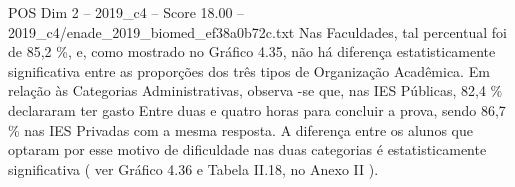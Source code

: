 \begin{textsample}{POS Dim 2 – 2019\_c4 – Score 18.00 – 2019\_c4/enade\_2019\_biomed\_ef38a0b72c.txt}
Nas Faculdades, tal percentual foi de 85,2 \%, e, como mostrado no Gráfico 4.35, não há diferença estatisticamente significativa entre as proporções dos três tipos de Organização Acadêmica.
Em relação às Categorias Administrativas, observa -se que, nas IES Públicas, 82,4 \% declararam ter gasto Entre duas e quatro horas para concluir a prova, sendo 86,7 \% nas IES Privadas com a mesma resposta.
A diferença entre os alunos que optaram por esse motivo de dificuldade nas duas categorias é estatisticamente significativa ( ver Gráfico 4.36 e Tabela II.18, no Anexo II ).

\end{textsample}
